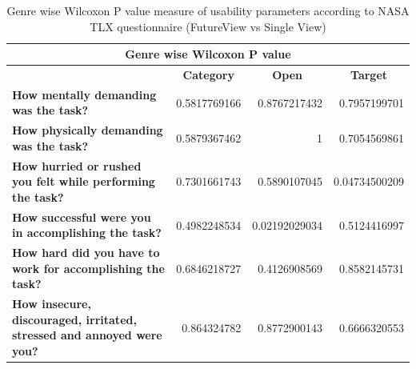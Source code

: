 \documentclass[english]{tktltiki}
\begin{document}
\fi


\begin{table}
	\small
	\begin{center}
    \begin{tabular}{|p{6cm}|r|r|r|}
        \hline
        \multicolumn{4}{|c|}{\textbf{Genre wise Wilcoxon P value}} \\
        \hline
        
        \multicolumn{1}{|c|}{} & \multicolumn{1}{|c|}{\textbf{Category}} & \multicolumn{1}{|c|}{\textbf{Open}} & \multicolumn{1}{|c|}{\textbf{Target}} \\
        \hline
        
        
        
        \textbf{How mentally demanding was the task?} & 0.5817769166 & 0.8767217432 & 0.7957199701 \\
        \hline
        
        \textbf{How physically demanding was the task?} & 0.5879367462 & 1 & 0.7054569861 \\
        \hline
        
        \textbf{How hurried or rushed you felt while performing the task?} & 0.7301661743 & 0.5890107045 & 0.04734500209 \\
        \hline
        
        \textbf{How successful were you in accomplishing the task?} & 0.4982248534 & 0.02192029034 & 0.5124416997 \\
        \hline
        
        \textbf{How hard did you have to work for accomplishing the task?} & 0.6846218727 & 0.4126908569 & 0.8582145731 \\
        \hline
        
        \textbf{How insecure, discouraged, irritated, stressed and annoyed were you?} & 0.864324782 & 0.8772900143 & 0.6666320553 \\
        \hline
        
    \end{tabular}
	\end{center}
	\caption{Genre wise Wilcoxon P value measure of usability parameters according to NASA TLX questionnaire (FutureView vs Single View)}
    \label{table:use_wilcoxon_genre}
\end{table}
\end{document}

